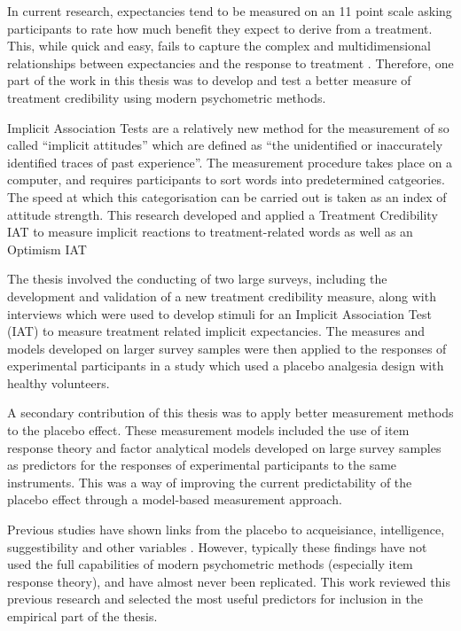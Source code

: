 \documentclass{article}
\begin{document}
In current research, expectancies tend to be measured on an 11 point scale asking participants to rate how much benefit they expect to derive from a treatment. This, while quick and easy, fails to capture the complex and multidimensional relationships between expectancies and the response to treatment \cite{Stone2005,Kaptchuk2008a}. Therefore, one part of the work in this thesis was to develop and test a better measure of treatment credibility using modern psychometric methods.    

Implicit Association Tests \cite{Greenwald1998} are a relatively new method for the measurement of so called ``implicit attitudes'' which are defined as ``the unidentified or inaccurately identified traces of past experience''. The measurement procedure takes place on a computer, and requires participants to sort words into predetermined catgeories. The speed at which this categorisation can be carried out is taken as an index of attitude strength. This research developed and applied a Treatment Credibility IAT to measure implicit reactions to treatment-related words as well as an Optimism IAT 

The thesis involved the conducting of two large surveys, including the development and validation of a new treatment credibility measure, along with interviews which were used to develop stimuli for an Implicit Association Test (IAT) to measure treatment related implicit expectancies. The measures and models developed on larger survey samples were then applied to the responses of experimental participants in a study which used a placebo analgesia design with healthy volunteers. 

A secondary contribution of this thesis was to apply better measurement methods to the placebo effect. These measurement models included the use of item response theory and factor analytical models developed on large survey samples as predictors for the responses of experimental participants to the same instruments. This was a way of improving the current predictability of the placebo effect through a model-based measurement approach. 


Previous studies have shown links from the placebo to acqueisiance, intelligence, suggestibility and other variables . However, typically these findings have not used the full capabilities of modern psychometric methods (especially item response theory), and have almost never been replicated. This work reviewed this previous research and selected the most useful predictors for inclusion in the empirical part of the thesis. 
\end{document}
